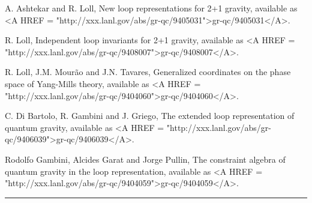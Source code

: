 A. Ashtekar and R. Loll,
New loop representations for 2+1 gravity, 
available as 
<A HREF = "http://xxx.lanl.gov/abs/gr-qc/9405031">gr-qc/9405031</A>.  

R. Loll, 
Independent loop invariants for 2+1 gravity, available as
<A HREF = "http://xxx.lanl.gov/abs/gr-qc/9408007">gr-qc/9408007</A>.  

R. Loll, J.M. Mour\~{a}o and J.N. Tavares, 
Generalized coordinates on the phase space of Yang-Mills theory, 
available as <A HREF = "http://xxx.lanl.gov/abs/gr-qc/9404060">gr-qc/9404060</A>.  

C. Di Bartolo, R. Gambini and J. Griego, 
The extended loop representation of quantum gravity, 
available as <A HREF = "http://xxx.lanl.gov/abs/gr-qc/9406039">gr-qc/9406039</A>.  

Rodolfo Gambini, Alcides Garat and Jorge Pullin, 
The constraint algebra of quantum gravity in the loop representation, 
available as <A HREF = "http://xxx.lanl.gov/abs/gr-qc/9404059">gr-qc/9404059</A>.  


\par\noindent\rule{\textwidth}{0.4pt}
